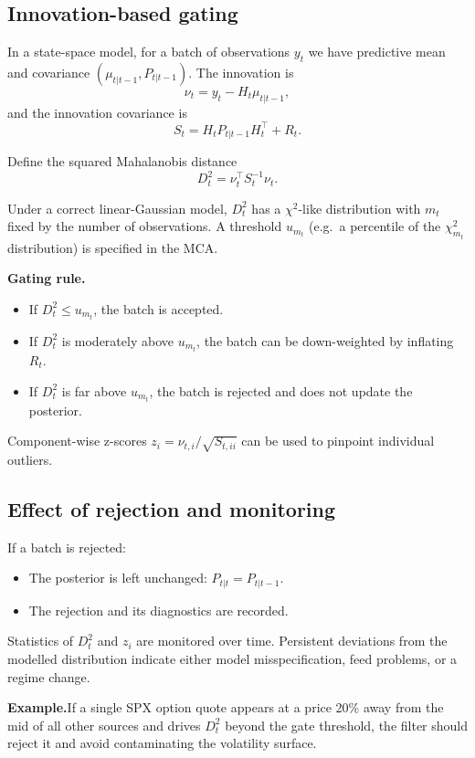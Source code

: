 \documentclass[11pt,a4paper]{article}
\begin{document}
\subsection{Innovation-based gating}

In a state-space model, for a batch of observations $y_t$ we have predictive mean and covariance $(\mu_{t|t-1}, P_{t|t-1})$. The innovation is
\[
    \nu_t = y_t - H_t \mu_{t|t-1},
\]
and the innovation covariance is
\[
    S_t = H_t P_{t|t-1} H_t^\top + R_t.
\]

Define the squared Mahalanobis distance
\[
    D_t^2 = \nu_t^\top S_t^{-1} \nu_t.
\]

Under a correct linear-Gaussian model, $D_t^2$ has a $\chi^2$-like distribution with $m_t$ fixed by the number of observations. A threshold $u_{m_t}$ (e.g.\ a percentile of the $\chi^2_{m_t}$ distribution) is specified in the MCA.

\textbf{Gating rule.}
\begin{itemize}
    \item If $D_t^2 \leq u_{m_t}$, the batch is accepted.
    \item If $D_t^2$ is moderately above $u_{m_t}$, the batch can be down-weighted by inflating $R_t$.
    \item If $D_t^2$ is far above $u_{m_t}$, the batch is rejected and does not update the posterior.
\end{itemize}

Component-wise z-scores $z_i = \nu_{t,i} / \sqrt{S_{t,ii}}$ can be used to pinpoint individual outliers.

\subsection{Effect of rejection and monitoring}

If a batch is rejected:
\begin{itemize}
    \item The posterior is left unchanged: $P_{t|t} = P_{t|t-1}$.
    \item The rejection and its diagnostics are recorded.
\end{itemize}

Statistics of $D_t^2$ and $z_i$ are monitored over time. Persistent deviations from the modelled distribution indicate either model misspecification, feed problems, or a regime change.

\textbf{Example.}\quad If a single SPX option quote appears at a price 20\% away from the mid of all other sources and drives $D_t^2$ beyond the gate threshold, the filter should reject it and avoid contaminating the volatility surface.
\end{document}
